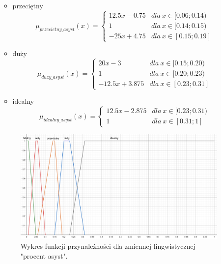 \documentclass{classrep}
\begin{document}
\begin{enumerate}
\begin{itemize}
\begin{equation}
        \end{equation}
        \item przeciętny
        \begin{equation}
            \mu_{przecietny\_asyst}(x) = \left\{\begin{matrix} 12.5x - 0.75 & dla \: x\in[0.06;0.14) \\ 1 & dla \: x\in [0.14; 0.15) \\ -25x + 4.75 & dla \: x\in[0.15;0.19] \end{matrix}\right.
        \end{equation}
        \item duży
        \begin{equation}
            \mu_{duzy\_asyst}(x) = \left\{\begin{matrix} 20x - 3 & dla \: x\in[0.15;0.20) \\ 1 & dla \: x\in [0.20; 0.23) \\ -12.5x + 3.875 & dla \: x\in[0.23;0.31] \end{matrix}\right.
        \end{equation}
        \item idealny
        \begin{equation}
            \mu_{idealny\_asyst}(x) = \left\{\begin{matrix} 12.5x - 2.875 & dla \: x\in[0.23;0.31) \\ 1 & dla \: x\in [0.31; 1] \end{matrix}\right.
        \end{equation}
    \end{itemize}
     \begin{figure}[H]
    \centering
    \includegraphics[width=14cm]{wykres_pr_asyst.png}
    \caption{Wykres funkcji przynależności dla zmiennej lingwistycznej "procent asyst".}
    \label{rysunek:procent_asyst}
\end{figure}
\end{enumerate}
\end{document}
